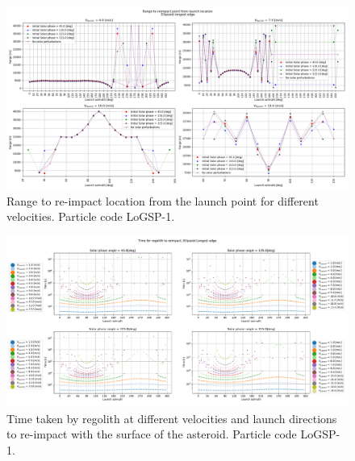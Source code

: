 \begin{figure}[htb]
\centering
\captionsetup{justification=centering}
\includegraphics[angle=90, width=\textwidth, height=\textheight, keepaspectratio=true]{longest_edge_perturbations/3.2Density_1cmSize/reimpactRangeComparison.png}
\caption{Range to re-impact location from the launch point for different velocities. Particle code LoGSP-1.}
\label{fig:LoGSP_1_range_comparison}
\end{figure}
\FloatBarrier
\begin{figure}[htb]
\centering
\captionsetup{justification=centering}
\includegraphics[angle=90, width=\textwidth, height=\textheight, keepaspectratio=true]{longest_edge_perturbations/3.2Density_1cmSize/time_to_reimpact_all_solar_phases.pdf}
\caption{Time taken by regolith at different velocities and launch directions to re-impact with the surface of the asteroid. Particle code LoGSP-1.}
\label{fig:LoGSP_1_reimpact_time}
\end{figure}
\FloatBarrier


